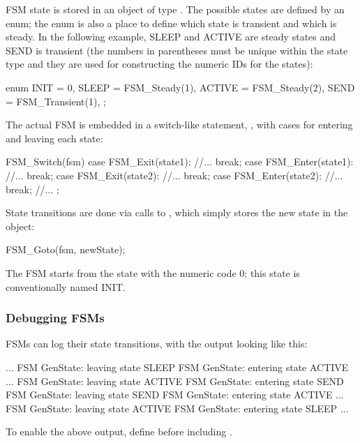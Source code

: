 \begin{ned}
FSM state is stored in an object of type . The possible states
are defined by an enum; the enum is also a place to define which
state is transient and which is steady. In the following example, SLEEP
and ACTIVE are steady states and SEND is transient (the numbers
in parentheses must be unique within the state type and they are used
for constructing the numeric IDs for the states):

\begin{cpp}
enum {
  INIT = 0,
  SLEEP = FSM_Steady(1),
  ACTIVE = FSM_Steady(2),
  SEND = FSM_Transient(1),
};
\end{cpp}

The actual FSM is embedded in a switch-like statement, ,
with cases for entering and leaving each state:

\begin{cpp}
FSM_Switch(fsm)
{
  case FSM_Exit(state1):
    //...
    break;
  case FSM_Enter(state1):
    //...
    break;
  case FSM_Exit(state2):
    //...
    break;
  case FSM_Enter(state2):
    //...
    break;
  //...
};
\end{cpp}


State transitions are done via calls to
, which simply stores the new state in the
 object:

\begin{cpp}
FSM_Goto(fsm, newState);
\end{cpp}

The FSM starts from the state with the numeric code 0; this state
is conventionally named INIT.


\subsubsection{Debugging FSMs}
\label{sec:simple-modules:debugging-fsms}

FSMs can log their state transitions, with the output looking like this:

\begin{filelisting}
...
FSM GenState: leaving state SLEEP
FSM GenState: entering state ACTIVE
...
FSM GenState: leaving state ACTIVE
FSM GenState: entering state SEND
FSM GenState: leaving state SEND
FSM GenState: entering state ACTIVE
...
FSM GenState: leaving state ACTIVE
FSM GenState: entering state SLEEP
...
\end{filelisting}

To enable the above output, define  before including .


\end{ned}
